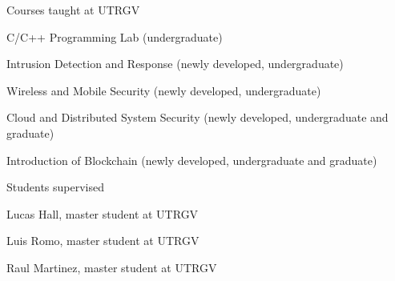 \begin{compactitem}
    \item Courses taught at UTRGV
        \begin{compactitem}
            \item C/C++ Programming Lab (undergraduate)
            \item Intrusion Detection and Response (newly developed, undergraduate)
            \item Wireless and Mobile Security (newly developed, undergraduate)
            \item Cloud and Distributed System Security (newly developed, undergraduate and graduate)
            \item Introduction of Blockchain (newly developed, undergraduate and graduate)
        \end{compactitem}
    \item Students supervised
        \begin{compactitem}
            \item Lucas Hall, master student at UTRGV
            \item Luis Romo, master student at UTRGV
            \item Raul Martinez, master student at UTRGV
        \end{compactitem}   
\end{compactitem}

